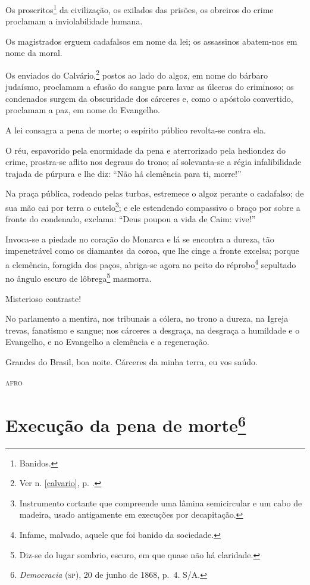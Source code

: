 Os proscritos\footnote{Banidos.} da civilização, os exilados das
prisões, os obreiros do crime proclamam a inviolabilidade humana.

Os magistrados erguem cadafalsos em nome da lei; os assassinos
abatem-nos em nome da moral.

Os enviados do Calvário,\footnote{Ver n. \ref{calvario}, p. \pageref{calvario}.} 
postos ao lado do algoz, em nome do bárbaro judaísmo,
proclamam a efusão do sangue para lavar as úlceras do criminoso; os
condenados surgem da obscuridade dos cárceres e, como o apóstolo
convertido, proclamam a paz, em nome do Evangelho.

A lei consagra a pena de morte; o espírito público revolta-se contra
ela.

O réu, espavorido pela enormidade da pena e aterrorizado pela hediondez
do crime, prostra-se aflito nos degraus do trono; aí solevanta-se a
régia infalibilidade trajada de púrpura e lhe diz: ``Não há clemência
para ti, morre!''

Na praça pública, rodeado pelas turbas, estremece o algoz perante o
cadafalso; de sua mão cai por terra o cutelo\footnote{Instrumento
  cortante que compreende uma lâmina semicircular e um cabo de madeira,
  usado antigamente em execuções por decapitação.}; e ele estendendo
compassivo o braço por sobre a fronte do condenado, exclama: ``Deus
poupou a vida de Caim: vive!''

Invoca-se a piedade no coração do Monarca e lá se encontra a dureza, tão
impenetrável como os diamantes da coroa, que lhe cinge a fronte excelsa;
porque a clemência, foragida dos paços, abriga-se agora no peito do
réprobo\footnote{Infame, malvado, aquele que foi banido da sociedade.}
sepultado no ângulo escuro de lôbrega\footnote{Diz-se do lugar
  sombrio, escuro, em que quase não há claridade.} masmorra.

Misterioso contraste!

No parlamento a mentira, nos tribunais a cólera, no trono a dureza, na
Igreja trevas, fanatismo e sangue; nos cárceres a desgraça, na desgraça
a humildade e o Evangelho, e no Evangelho a clemência e a regeneração.

Grandes do Brasil, boa noite. Cárceres da minha terra, eu vos saúdo.

\begin{flushright}
\textsc{afro}
\end{flushright}


\chapter{Execução da pena de morte\footnote{\emph{Democracia} (\textsc{sp}),
  20 de junho de 1868, p.~4. S/A.}}

